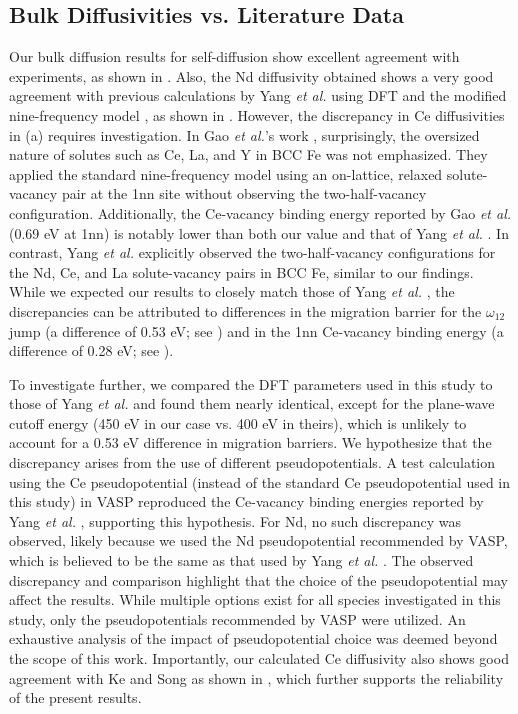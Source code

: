 \documentclass[preprint,12pt]{elsarticle}
\begin{document}
\subsection{Bulk Diffusivities vs. Literature Data}
\label{sec:discussion1}
\noindent Our bulk diffusion results for self-diffusion show excellent agreement with experiments, as shown in . Also, the Nd diffusivity obtained shows a very good agreement with previous calculations by Yang \textit{et al.} \cite{yang_significant_2023} using DFT and the modified nine-frequency model \cite{bocquet_migration_2017}, as shown in . However, the discrepancy in Ce diffusivities in (a) requires investigation.
In Gao \textit{et al.}'s work \cite{GAO2016316}, surprisingly, the oversized nature of solutes such as Ce, La, and Y in BCC Fe was not emphasized. They applied the standard nine-frequency model \cite{leclaire1970} using an on-lattice, relaxed solute-vacancy pair at the 1nn site without observing the two-half-vacancy configuration. Additionally, the Ce-vacancy binding energy reported by Gao \textit{et al.} (0.69 eV at 1nn) is notably lower than both our value and that of Yang \textit{et al.} \cite{yang_significant_2023}.
In contrast, Yang \textit{et al.} \cite{yang_significant_2023} explicitly observed the two-half-vacancy configurations for the Nd, Ce, and La solute-vacancy pairs in BCC Fe, similar to our findings. While we expected our results to closely match those of Yang \textit{et al.} \cite{yang_significant_2023}, the discrepancies can be attributed to differences in the migration barrier for the $\omega_{12}$ jump (a difference of 0.53 eV; see ) and in the 1nn Ce-vacancy binding energy (a difference of 0.28 eV; see ).

To investigate further, we compared the DFT parameters used in this study to those of Yang \textit{et al.} \cite{yang_significant_2023} and found them nearly identical, except for the plane-wave cutoff energy (450 eV in our case vs. 400 eV in theirs), which is unlikely to account for a 0.53 eV difference in migration barriers. We hypothesize that the discrepancy arises from the use of different pseudopotentials. A test calculation using the Ce pseudopotential (instead of the standard Ce pseudopotential used in this study) in VASP reproduced the Ce-vacancy binding energies reported by Yang \textit{et al.} \cite{yang_significant_2023}, supporting this hypothesis. For Nd, no such discrepancy was observed, likely because we used the Nd pseudopotential recommended by VASP, which is believed to be the same as that used by Yang \textit{et al.} \cite{yang_significant_2023}. The observed discrepancy and comparison highlight that the choice of the pseudopotential may affect the results. While multiple options exist for all species investigated in this study, only the pseudopotentials recommended by VASP were utilized. An exhaustive analysis of the impact of pseudopotential choice was deemed beyond the scope of this work.
Importantly, our calculated Ce diffusivity also shows good agreement with Ke and Song \cite{ke2025diffusion} as shown in , which further supports the reliability of the present results.
\end{document}
